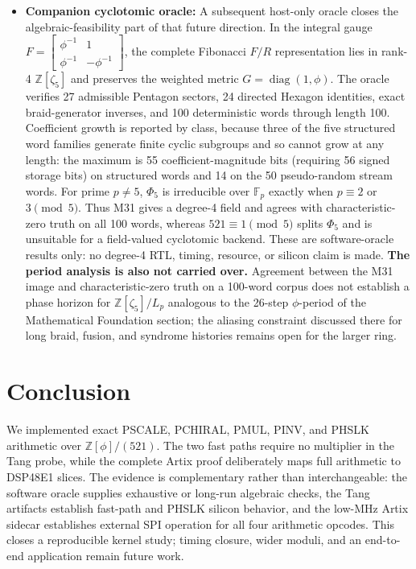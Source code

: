 \documentclass[conference]{IEEEtran}
\begin{document}
\begin{itemize}
    $\mathbb{Z}[\zeta_5]$, which would carry the $R$-matrix phases natively
    and contain the present ring as its real subfield.
    \item \textbf{Companion cyclotomic oracle:} A subsequent host-only oracle
    closes the algebraic-feasibility part of that future direction. In the
    integral gauge
    $F=\left[\begin{smallmatrix}\phi^{-1}&1\\
    \phi^{-1}&-\phi^{-1}\end{smallmatrix}\right]$, the complete Fibonacci
    $F/R$ representation lies in rank-4 $\mathbb{Z}[\zeta_5]$ and preserves
    the weighted metric $G=\operatorname{diag}(1,\phi)$. The oracle verifies
    27 admissible Pentagon sectors, 24 directed Hexagon identities, exact
    braid-generator inverses, and 100 deterministic words through length 100.
    Coefficient growth is reported by class, because three of the five
    structured word families generate finite cyclic subgroups and so cannot
    grow at any length: the maximum is 55 coefficient-magnitude bits (requiring 56 signed storage bits) on
    structured words and 14 on the 50 pseudo-random stream words. For prime
    $p\ne5$, $\Phi_5$ is irreducible over $\mathbb{F}_p$ exactly when
    $p\equiv2$ or $3\pmod 5$. Thus M31 gives a degree-4 field and agrees with
    characteristic-zero truth on all 100 words, whereas $521\equiv1\pmod5$
    splits $\Phi_5$ and is unsuitable for a field-valued cyclotomic backend.
    These are software-oracle results only: no degree-4 RTL, timing, resource,
    or silicon claim is made. \textbf{The period analysis is also not carried
    over.} Agreement between the M31 image and characteristic-zero truth on a
    100-word corpus does not establish a phase horizon for
    $\mathbb{Z}[\zeta_5]/L_p$ analogous to the 26-step $\phi$-period of the
    Mathematical Foundation section; the aliasing constraint discussed there
    for long braid, fusion, and syndrome histories remains open for the larger
    ring.
\end{itemize}

\section{Conclusion}

We implemented exact PSCALE, PCHIRAL, PMUL, PINV, and PHSLK arithmetic over
$\mathbb{Z}[\phi]/(521)$. The two fast paths require no multiplier in the
Tang probe, while the complete Artix proof deliberately maps full arithmetic
to DSP48E1 slices. The evidence is complementary rather than interchangeable:
the software oracle supplies exhaustive or long-run algebraic checks, the Tang
artifacts establish fast-path and PHSLK silicon behavior, and the low-MHz Artix
sidecar establishes external SPI operation for all four arithmetic opcodes.
This closes a reproducible kernel study; timing closure, wider moduli, and an
end-to-end application remain future work.
\end{document}
